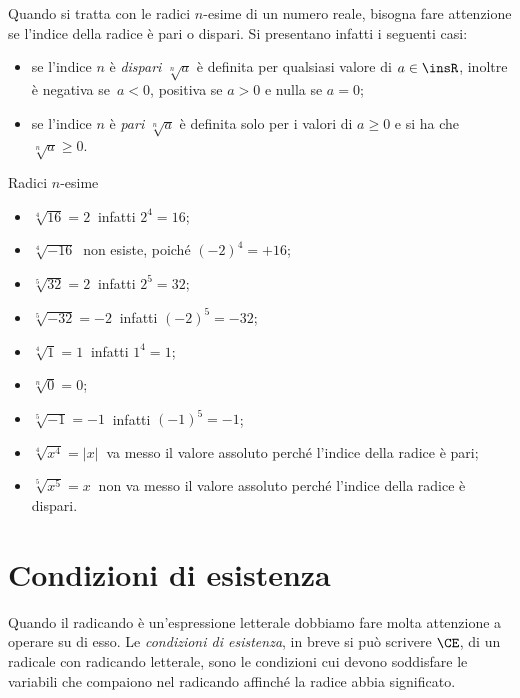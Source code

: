 Quando si tratta con le radici $n$-esime di un numero reale, bisogna fare attenzione se l'indice della radice è pari o dispari. Si presentano infatti i seguenti casi:
\begin{itemize}
 \item se l'indice $n$ è \emph{dispari} $\sqrt[n]{a}$ è definita per qualsiasi valore di $a\in \insR$, inoltre è negativa se~$a<0$, positiva se $a>0$ e nulla se $a=0$;
 \item se l'indice $n$ è \emph{pari} $\sqrt[n]{a}$ è definita solo per i valori di $a\geq 0$ e si ha che $\sqrt[n]{a}\ge 0$.
\end{itemize}
\pagebreak
\begin{exrig}
\begin{esempio}
Radici $n$-esime
\begin{multicols}{2}
 \begin{itemize}
 \item $\sqrt[4]{16}=2\:$ infatti $2^4=16$;
 \item $\sqrt[4]{-16}\:$ non esiste, poiché $(-2)^4=+16$;
 \item $\sqrt[5]{32}=2\:$ infatti $2^5=32$;
 \item $\sqrt[5]{-32}=-2\:$ infatti $(-2)^5=-32$;
 \item $\sqrt[4]{1}=1\:$ infatti $1^4=1$;
 \item $\sqrt[n]{0}=0$;
 \item $\sqrt[5]{-1}=-1\:$ infatti $(-1)^5=-1$;
 \item $\sqrt[4]{x^4}=\left|x\right|\:$ va messo il valore assoluto perché l'indice della radice è pari;
 \item $\sqrt[5]{x^5}=x\:$ non va messo il valore assoluto perché l'indice della radice è dispari.
\end{itemize}
\end{multicols}
\end{esempio}
\end{exrig}

\ovalbox{\risolvii \ref{ese:2.1}, \ref{ese:2.2}, \ref{ese:2.3}, \ref{ese:2.4}, \ref{ese:2.5}, \ref{ese:2.6}, \ref{ese:2.7}, \ref{ese:2.8}, \ref{ese:2.9}, \ref{ese:2.10}}

\section{Condizioni di esistenza}

Quando il radicando è un'espressione letterale dobbiamo fare molta attenzione a operare su di esso.
Le \emph{condizioni di esistenza}, in breve si può scrivere $\CE$, di un radicale con radicando letterale, sono le condizioni cui devono soddisfare le variabili che compaiono nel radicando affinché la radice abbia significato.

